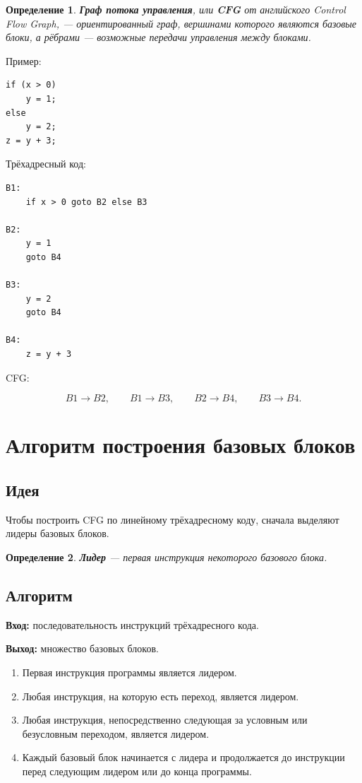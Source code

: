 \documentclass[12pt,a4paper]{article}
\newtheorem{definition}{Определение}
\begin{document}
\begin{definition}
\textbf{Граф потока управления}, или \textbf{CFG} от английского \emph{Control Flow Graph}, --- ориентированный граф, вершинами которого являются базовые блоки, а рёбрами --- возможные передачи управления между блоками.
\end{definition}

Пример:

\begin{lstlisting}
if (x > 0)
    y = 1;
else
    y = 2;
z = y + 3;
\end{lstlisting}

Трёхадресный код:

\begin{lstlisting}
B1:
    if x > 0 goto B2 else B3

B2:
    y = 1
    goto B4

B3:
    y = 2
    goto B4

B4:
    z = y + 3
\end{lstlisting}

CFG:

\[
B1 \to B2,\qquad B1 \to B3,\qquad B2 \to B4,\qquad B3 \to B4.
\]

\section{Алгоритм построения базовых блоков}

\subsection{Идея}

Чтобы построить CFG по линейному трёхадресному коду, сначала выделяют лидеры базовых блоков.

\begin{definition}
\textbf{Лидер} --- первая инструкция некоторого базового блока.
\end{definition}

\subsection{Алгоритм}

\textbf{Вход:} последовательность инструкций трёхадресного кода.

\textbf{Выход:} множество базовых блоков.

\begin{enumerate}
    \item Первая инструкция программы является лидером.
    \item Любая инструкция, на которую есть переход, является лидером.
    \item Любая инструкция, непосредственно следующая за условным или безусловным переходом, является лидером.
    \item Каждый базовый блок начинается с лидера и продолжается до инструкции перед следующим лидером или до конца программы.
\end{enumerate}
\end{document}
